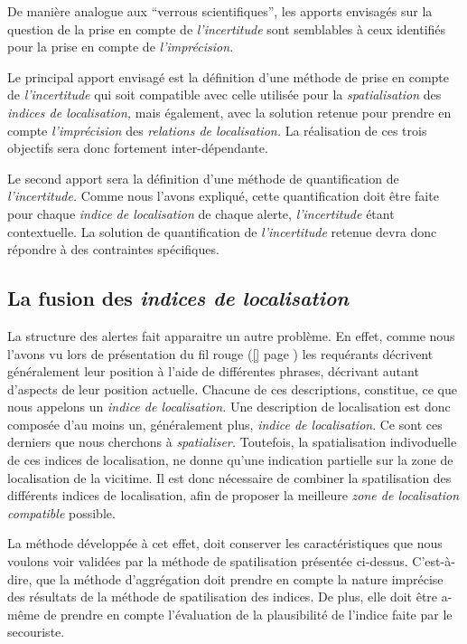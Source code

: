 De manière analogue aux \enquote{verrous scientifiques}, les apports
envisagés sur la question de la prise en compte de
\emph{l'incertitude} sont semblables à ceux identifiés pour la prise
en compte de \emph{l'imprécision.}

Le principal apport envisagé est la définition d'une méthode de prise
en compte de \emph{l'incertitude} qui soit compatible avec celle
utilisée pour la \emph{spatialisation} des \emph{indices de
  localisation,} mais également, avec la solution retenue pour prendre
en compte \emph{l'imprécision} des \emph{relations de localisation.}
La réalisation de ces trois objectifs sera donc fortement
inter-dépendante.

Le second apport sera la définition d'une méthode de quantification de
\emph{l'incertitude.} Comme nous l'avons expliqué, cette
quantification doit être faite pour chaque \emph{indice de
  localisation} de chaque alerte, \emph{l'incertitude} étant
contextuelle. La solution de quantification de \emph{l'incertitude}
retenue devra donc répondre à des contraintes spécifiques.

\subsection{La fusion des \emph{indices de localisation}}
\label{subsec:2-1-4}

La structure des alertes fait apparaitre un autre problème. En effet,
comme nous l'avons vu lors de présentation du fil rouge (\ref{} page
\pageref{}) les requérants décrivent généralement leur position à
l'aide de différentes phrases, décrivant autant d'aspects de leur
position actuelle. Chacune de ces descriptions, constitue, ce que nous
appelons un \emph{indice de localisation.} Une description de
localisation est donc composée d'au moins un, généralement plus,
\emph{indice de localisation}. Ce sont ces derniers que nous cherchons
à \emph{spatialiser.} Toutefois, la spatialisation indivoduelle de ces
indices de localisation, ne donne qu'une indication partielle sur la
zone de localisation de la vicitime. Il est donc nécessaire de
combiner la spatilisation des différents indices de localisation, afin
de proposer la meilleure \emph{zone de localisation compatible}
possible.

La méthode développée à cet effet, doit conserver les caractéristiques
que nous voulons voir validées par la méthode de spatilisation
présentée ci-dessus. C'est-à-dire, que la méthode d'aggrégation doit
prendre en compte la nature imprécise des résultats de la méthode de
spatilisation des indices. De plus, elle doit être a-même de prendre
en compte l'évaluation de la plausibilité de l'indice faite par le
secouriste.

